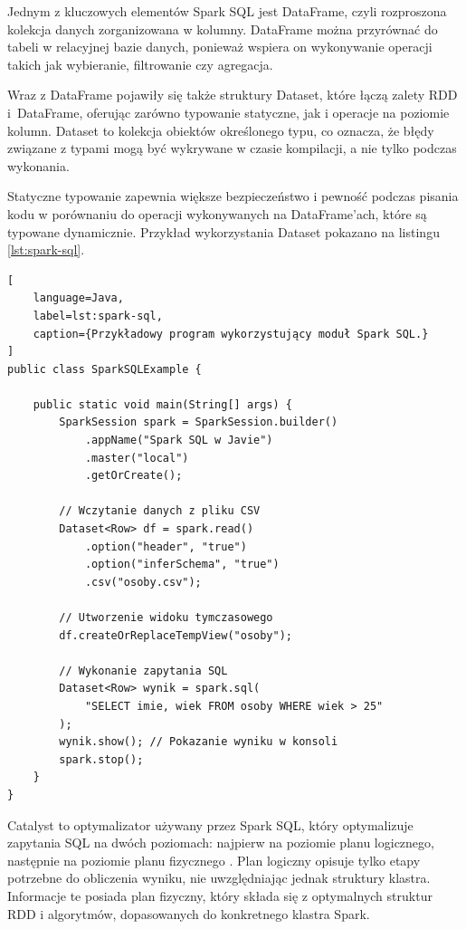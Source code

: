 Jednym z kluczowych elementów Spark SQL jest DataFrame, czyli rozproszona kolekcja danych
zorganizowana w kolumny. DataFrame można przyrównać do tabeli w relacyjnej bazie danych,
ponieważ wspiera on wykonywanie operacji takich jak wybieranie, filtrowanie czy agregacja.

Wraz z DataFrame pojawiły się także struktury Dataset, które łączą zalety RDD i~DataFrame,
oferując zarówno typowanie statyczne, jak i operacje na poziomie kolumn. Dataset to kolekcja
obiektów określonego typu, co oznacza, że błędy związane z typami mogą być wykrywane w czasie
kompilacji, a nie tylko podczas wykonania.

Statyczne typowanie zapewnia większe bezpieczeństwo i pewność podczas pisania kodu w
porównaniu do operacji wykonywanych na DataFrame'ach, które są typowane dynamicznie.
Przykład wykorzystania Dataset pokazano na listingu \ref{lst:spark-sql}.
\newpage

\begin{lstlisting}[
    language=Java,
    label=lst:spark-sql,
    caption={Przykładowy program wykorzystujący moduł Spark SQL.}
]
public class SparkSQLExample {

    public static void main(String[] args) {
        SparkSession spark = SparkSession.builder()
            .appName("Spark SQL w Javie")
            .master("local")
            .getOrCreate();

        // Wczytanie danych z pliku CSV
        Dataset<Row> df = spark.read()
            .option("header", "true")
            .option("inferSchema", "true")
            .csv("osoby.csv");

        // Utworzenie widoku tymczasowego
        df.createOrReplaceTempView("osoby");

        // Wykonanie zapytania SQL
        Dataset<Row> wynik = spark.sql(
            "SELECT imie, wiek FROM osoby WHERE wiek > 25"
        );
        wynik.show(); // Pokazanie wyniku w konsoli
        spark.stop();
    }
}
\end{lstlisting}

Catalyst to optymalizator używany przez Spark SQL, który optymalizuje zapytania SQL na dwóch
poziomach: najpierw na poziomie planu logicznego, następnie na poziomie planu fizycznego
\cite{spark-sql-catalyst}. Plan logiczny opisuje tylko etapy potrzebne do obliczenia wyniku,
nie uwzględniając jednak struktury klastra. Informacje te posiada plan fizyczny, który składa
się z optymalnych struktur RDD i algorytmów, dopasowanych do konkretnego klastra Spark.

